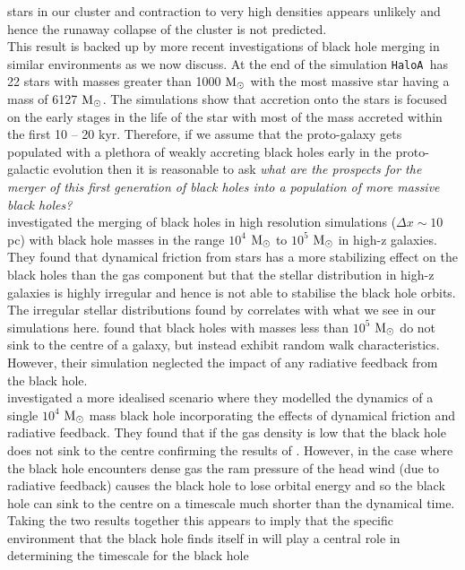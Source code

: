 \documentclass[graphics, twocolumn, usenatbib]{mn2e}
\newcommand{\msolar} {$\rm{M_{\odot}}~$}
\newcommand{\msolarc} {$\rm{M_{\odot}}$}
\newcommand{\ha} {\texttt{HaloA~}}
\begin{document}
stars in our cluster and contraction to very high densities appears unlikely and hence the
runaway collapse of the cluster is not predicted. \\
\indent This result is backed up by more recent investigations of black hole merging in similar
environments as we now discuss. 
At the end of the simulation \ha has 22 stars with masses greater than 1000 \msolar with
the most massive star having a mass of 6127 \msolarc. The simulations show that accretion onto
the stars is
focused on the early stages in the life of the star with most of the mass accreted within the
first 10 -- 20 kyr. Therefore, if we assume that the proto-galaxy gets populated with a plethora of
weakly accreting black holes early in the proto-galactic evolution then it is reasonable to ask \textit{what are the prospects for the merger of this first generation
  of black holes into a population of more massive black holes?}\\
\indent \cite{Pfister_2019} investigated the merging of black holes in high resolution
simulations ($\Delta x \sim 10$ pc) with black hole masses in the range
$10^4$ \msolar to $10^5$ \msolar in high-z galaxies. They found that dynamical friction from stars
has a more stabilizing effect on the black holes than the gas component but that the stellar
distribution in high-z galaxies is highly irregular and hence is not able to stabilise the black
hole orbits.
The irregular stellar distributions found by \cite{Pfister_2019} correlates with what
we see in our simulations here. \cite{Pfister_2019} found that black holes with masses less than
$10^5$ \msolar do not sink to the centre of a galaxy, but instead exhibit random walk characteristics.
However, their simulation neglected the impact of any radiative feedback from the black hole.\\
\indent \cite{Toyouchi_2020} investigated a more idealised scenario where they modelled the
dynamics of a single $10^4$ \msolar mass black hole incorporating the effects of dynamical friction
and radiative feedback. They found that if the gas density is low that the black hole
does not sink to the centre confirming the results of \cite{Pfister_2019}. However, in the case where
the black hole encounters dense gas the ram pressure of the head wind (due to radiative feedback)
causes the black hole to lose orbital energy and so the black hole can sink to the centre on a
timescale much shorter than the dynamical time. Taking the two results together this
appears to imply that the specific environment that the black hole finds
itself in will play a central role in determining the timescale for the black hole
\end{document}
